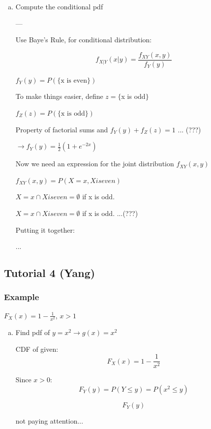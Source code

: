 \documentclass{report}
\begin{document}
\begin{enumerate}[(a)]
\item Compute the conditional pdf

---

Use Baye's Rule, for conditional distribution:

$$f_{X|Y} (x|y) = \frac{f_{XY} (x,y)}{f_Y(y)}$$

$f_Y(y) = P( \text{\{x is even\}})$

To make things easier, define $z =\{$x is odd$\}$ 

$f_Z(z) = P( \text{\{x is odd\}})$


Property of factorial sums and $f_Y(y) + f_Z(z) = 1$ ... (???) 

$\rightarrow f_Y(y) = \frac{1}{2} (1 +e^{-2x})$

Now we need an expression for the joint distribution $f_{XY} (x,y)$

$f_{XY}(x,y) = P(X = x, X is even)$

${X = x} \cap {X is even} = \emptyset$ if x is odd.

${X = x} \cap {X is even} = \emptyset$ if x is odd. ...(???)

Putting it together:

...


\end{enumerate}





\subsection{Tutorial 4 (Yang)}

\subsubsection*{Example}

$F_X(x) = 1 - \frac{1}{x^2}$, $x > 1$

\begin{enumerate}[(a)]
\item Find pdf of $y = x^2 \rightarrow g(x) = x^2$

CDF of given: $$F_X(x) = 1 - \frac{1}{x^2}$$

Since $x>0$: $$F_Y(y) = P(Y \leq y) = P(x^2 \leq y)$$

$$F_Y(y)$$

not paying attention...

\end{enumerate}
\end{document}
